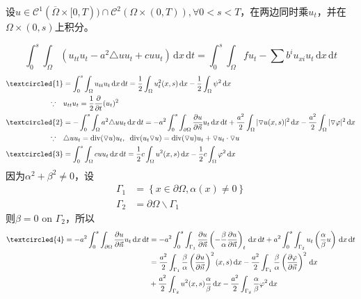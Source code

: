 \documentclass[11pt, a4paper]{article}
\theoremstyle{theorem}
\newcommand{\intd}[1]{\,\mathrm{d}{#1}}
\begin{document}
设$u \in \mathcal{C}^1(\overline{\Omega} \times [0,T)) \cap \mathcal{C}^2(\Omega \times (0,T)), \forall 0 < s < T$，在两边同时乘$u_t$，并在$\Omega \times (0, s)$上积分。

$$
\int_0^s \int_\Omega (u_{tt}u_t - a^2 \triangle u u_t + c u u_t) \intd x \intd t = \int_0^s \int_\Omega f u_t - \sum b^i u_{xi} u_t \intd x \intd t
$$
\begin{align*}
    \textcircled{1} &= \int_0^s \int_\Omega u_{tt}u_t \intd x \intd t = \frac{1}{2} \int_\Omega u^2_t(x,s) \intd x - \frac{1}{2} \int_\Omega \psi^2 \intd x \\
    \because \quad &u_{tt} u_t = \frac{1}{2} \frac{\partial}{\partial t} (u_t)^2 \\
    \textcircled{2} &= - \int_0^s \int_\Omega a^2 \triangle u u_t \intd x \intd t = -a^2 \int_0^s \int_{\partial \Omega} \frac{\partial u }{\partial \vec{n}} u_t \intd x \intd t + \frac{a^2}{2} \int_\Omega |\triangledown u(x,s)|^2 \intd x - \frac{a^2}{2} \int_\Omega |\triangledown \varphi|^2 \intd x \\
    \because \quad &\triangle u u_t = \text{div}(\triangledown u) u_t, \; \; \text{div}(u_t \triangledown u) = \text{div}(\triangledown u)u_t + \triangledown u_t \cdot \triangledown u\\
    \textcircled{3} &= \int_0^s \int_\Omega c u u_t \intd x \intd t =  \frac{1}{2} c \int_\Omega u^2(x,s) \intd x - \frac{1}{2} c \int_\Omega \varphi^2 \intd x\\
\end{align*}
因为$\alpha^2 + \beta^2 \neq 0$，设
\begin{align*}
    \Gamma_1 &= \left\{x \in \partial \Omega, \alpha(x) \neq 0\right\} \\
    \Gamma_2 &= \partial \Omega \backslash \Gamma_1
\end{align*}
则$\beta = 0$ on $\Gamma_2$，所以
\begin{align*}
\textcircled{4} = -a^2 \int_0^s \int_{\partial \Omega} \frac{\partial u }{\partial \vec{n}} u_t \intd x \intd t
    &= -a^2 \int_0^s \int_{\Gamma_1} \frac{\partial u }{\partial \vec{n}} \left(- \frac{\beta}{\alpha} \frac{\partial u }{\partial \vec{n}}\right)_t \intd x \intd t + a^2 \int_0^s \int_{\Gamma_2} u_t \left(\frac{\alpha}{\beta}u\right) \intd x \intd t \\
    &= \frac{a^2}{2} \int_{\Gamma_1} \frac{\beta}{\alpha} \left(\frac{\partial u }{\partial \vec{n}}\right)^2 (x,s) \intd x - \frac{a^2}{2} \int_{\Gamma_1} \frac{\beta}{\alpha} \left(\frac{\partial \varphi }{\partial \vec{n}}\right)^2 \intd x \\
    &+ \frac{a^2}{2} \int_{\Gamma_2} u^2(x,s) \frac{\alpha}{\beta} \intd x - \frac{a^2}{2} \int_{\Gamma_2} \frac{\alpha}{\beta} \varphi^2 \intd x
\end{align*}
\end{document}
